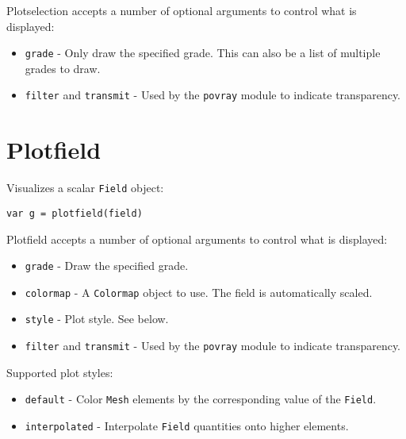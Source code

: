 Plotselection accepts a number of optional arguments to control what is
displayed:

\begin{itemize}

\item
  \texttt{grade} - Only draw the specified grade. This can also be a
  list of multiple grades to draw.
\item
  \texttt{filter} and \texttt{transmit} - Used by the \texttt{povray}
  module to indicate transparency.
\end{itemize}

\hypertarget{plotfield}{%
\section{Plotfield}\label{plotfield}}

Visualizes a scalar \texttt{Field} object:

\begin{lstlisting}
var g = plotfield(field)
\end{lstlisting}

Plotfield accepts a number of optional arguments to control what is
displayed:

\begin{itemize}

\item
  \texttt{grade} - Draw the specified grade.
\item
  \texttt{colormap} - A \texttt{Colormap} object to use. The field is
  automatically scaled.
\item
  \texttt{style} - Plot style. See below.
\item
  \texttt{filter} and \texttt{transmit} - Used by the \texttt{povray}
  module to indicate transparency.
\end{itemize}

Supported plot styles:

\begin{itemize}

\item
  \texttt{default} - Color \texttt{Mesh} elements by the corresponding
  value of the \texttt{Field}.
\item
  \texttt{interpolated} - Interpolate \texttt{Field} quantities onto
  higher elements.
\end{itemize}
